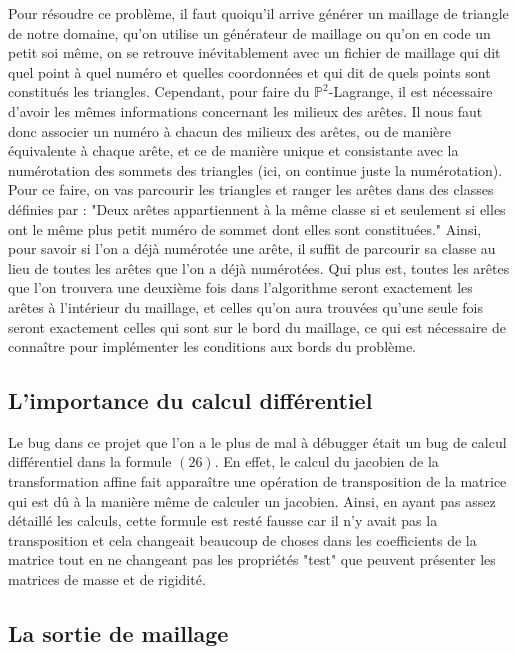 \documentclass[a4paper,12pt]{article}
\begin{document}
Pour résoudre ce problème, il faut quoiqu'il arrive générer un maillage de triangle de notre domaine, qu'on utilise un générateur de maillage ou qu'on en code un petit soi même, on se retrouve inévitablement avec un fichier de maillage qui dit quel point à quel numéro et quelles coordonnées et qui dit de quels points sont constitués les triangles. Cependant, pour faire du $\mathbb{P}^2$-Lagrange, il est nécessaire d'avoir les mêmes informations concernant les milieux des arêtes. Il nous faut donc associer un numéro à chacun des milieux des arêtes, ou de manière équivalente à chaque arête, et ce de manière unique et consistante avec la numérotation des sommets des triangles (ici, on continue juste la numérotation).
Pour ce faire, on vas parcourir les triangles et ranger les arêtes dans des classes définies par : "Deux arêtes appartiennent à la même classe si et seulement si elles ont le même plus petit numéro de sommet dont elles sont constituées."
Ainsi, pour savoir si l'on a déjà numérotée une arête, il suffit de parcourir sa classe au lieu de toutes les arêtes que l'on a déjà numérotées. Qui plus est, toutes les arêtes que l'on trouvera une deuxième fois dans l'algorithme seront exactement les arêtes à l'intérieur du maillage, et celles qu'on aura trouvées qu'une seule fois seront exactement celles qui sont sur le bord du maillage, ce qui est nécessaire de connaître pour implémenter les conditions aux bords du problème.

\subsection{L'importance du calcul différentiel}

Le bug dans ce projet que l'on a le plus de mal à débugger était un bug de calcul différentiel dans la formule $(26)$.
En effet, le calcul du jacobien de la transformation affine fait apparaître une opération de transposition de la matrice qui est dû à la manière même de calculer un jacobien. Ainsi, en ayant pas assez détaillé les calculs, cette formule est resté fausse car il n'y avait pas la transposition et cela changeait beaucoup de choses dans les coefficients de la matrice tout en ne changeant pas les propriétés "test" que peuvent présenter les matrices de masse et de rigidité.

\subsection{La sortie de maillage}
\end{document}
